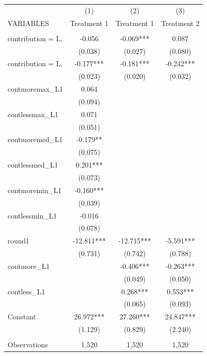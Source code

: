 \documentclass[]{article}
\begin{document}
\begin{tabular}{lccc} \hline
 & (1) & (2) & (3) \\
VARIABLES & Treatment 1 & Treatment 1 & Treatment 2 \\ \hline
 &  &  &  \\
contribution = L, & -0.056 & -0.069*** & 0.087 \\
 & (0.038) & (0.027) & (0.080) \\
contribution = L, & -0.177*** & -0.181*** & -0.242*** \\
 & (0.023) & (0.020) & (0.032) \\
contmoremax\_L1 & 0.064 &  &  \\
 & (0.094) &  &  \\
contlessmax\_L1 & 0.071 &  &  \\
 & (0.051) &  &  \\
contmoremed\_L1 & -0.179** &  &  \\
 & (0.075) &  &  \\
contlessmed\_L1 & 0.201*** &  &  \\
 & (0.073) &  &  \\
contmoremin\_L1 & -0.160*** &  &  \\
 & (0.039) &  &  \\
contlessmin\_L1 & -0.016 &  &  \\
 & (0.078) &  &  \\
round1 & -12.811*** & -12.715*** & -5.591*** \\
 & (0.731) & (0.742) & (0.788) \\
contmore\_L1 &  & -0.406*** & -0.263*** \\
 &  & (0.049) & (0.050) \\
contless\_L1 &  & 0.268*** & 0.553*** \\
 &  & (0.065) & (0.093) \\
Constant & 26.972*** & 27.260*** & 24.847*** \\
 & (1.129) & (0.829) & (2.240) \\
 &  &  &  \\
 Observations & 1,520 & 1,520 & 1,520 \\ \hline
\end{tabular}
\end{document}
